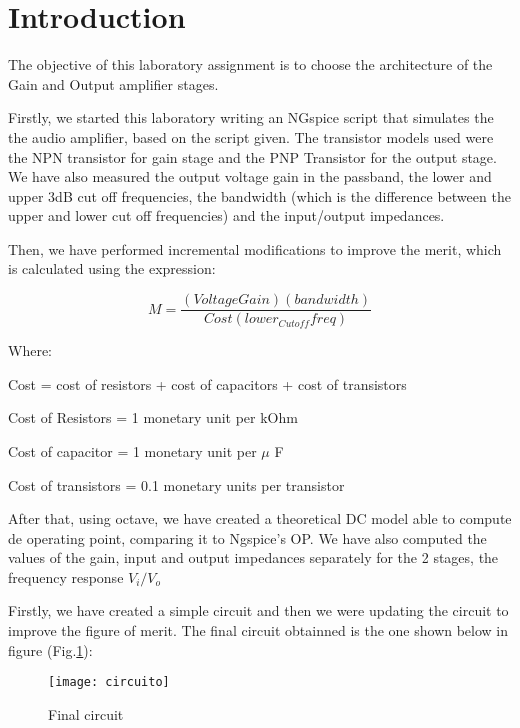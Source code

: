 \section{Introduction}
\label{sec:introduction}

The objective of this laboratory assignment is to choose the architecture of the Gain and Output amplifier stages. \par
Firstly, we started this laboratory writing an NGspice script that simulates the the audio amplifier, based on the script given. The transistor models used were the NPN transistor for gain stage and the PNP Transistor for the output stage. We have also measured the output voltage gain in the passband, the lower and upper 3dB cut off frequencies, the bandwidth (which is the difference between the upper and lower cut off frequencies) and the input/output impedances. \par
Then, we have performed incremental modifications to improve the merit, which is calculated using the expression: \par

\begin{equation}
    M = \frac{(VoltageGain)(bandwidth)}{Cost(lower_{Cutoff}freq)}
\end{equation}\par
Where: \par
Cost = cost of resistors + cost of capacitors + cost of transistors \par
Cost of Resistors = 1 monetary unit per kOhm \par
Cost of capacitor = 1 monetary unit per $\mu$ F \par
Cost of transistors = 0.1 monetary units per transistor \par

After that, using octave, we have created a theoretical DC model able to compute de operating point, comparing it to Ngspice’s OP. We have also computed the values of the gain, input and output
impedances separately for the 2 stages, the frequency response $V_{i} / V_{o}$

Firstly, we have created a simple circuit and then we were updating the circuit to improve the figure of merit. The final circuit obtainned is the one shown below in figure (Fig.\ref{fig:circuito}): \par

\begin{figure}[H]
\centering
\texttt{[image: circuito]}
\caption{Final circuit}
\label{fig:circuito}
\end{figure}


